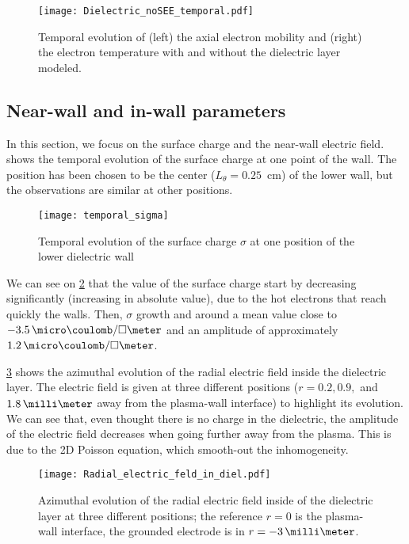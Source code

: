   \begin{figure}[hbt]
    \centering
    \texttt{[image: Dielectric\_noSEE\_temporal.pdf]}
    \caption{Temporal evolution of (left) the axial electron mobility and (right) the electron temperature with and without the dielectric layer modeled.}
    \label{fig-mod_diel_comp}
  \end{figure}

  
  \subsection{Near-wall and in-wall parameters} \label{subsec-nearwall}
    In this section, we focus on the surface charge and the near-wall electric field.
     shows the temporal evolution of the surface charge at one point of the wall.
    The position has been chosen to be the center ($L_{\theta} = 0.25$~cm) of the lower wall, but the observations are similar at other positions.
     
    \begin{figure}[hbt]
      \centering
      \texttt{[image: temporal\_sigma]}
      \caption{Temporal evolution of the surface charge $\sigma$ at one position of the lower dielectric wall}
      \label{fig-sigma_time}
    \end{figure}

    We can see on \cref{fig-sigma_time} that the value of the surface charge start by decreasing significantly (increasing in absolute value), due to the hot electrons that reach quickly the walls.
    Then, $\sigma$ growth and around a mean value close to $-3.5 \,\micro\coulomb/\square\meter$ and an amplitude of approximately $1.2 \,\micro\coulomb/\square\meter$.
    
    \cref{fig-indiel} shows the azimuthal evolution of the radial electric field inside the dielectric layer.
    The electric field is given at three different positions ($r=0.2, 0.9,$ and $1.8\,\milli\meter$ away from the plasma-wall interface) to highlight its evolution.
    We can see that, even thought there is no charge in the dielectric, the amplitude of the electric field decreases when going further away from the plasma.
    This is due to the \ac{2D} Poisson equation, which smooth-out the inhomogeneity.
     
    \begin{figure}[hbt]
      \centering
      \texttt{[image: Radial\_electric\_feld\_in\_diel.pdf]}
      \caption{Azimuthal evolution of the radial electric field inside of the dielectric layer at three different positions; the reference $r=0$ is the plasma-wall interface, the grounded electrode is in $r=-3\,\milli\meter$.}
      \label{fig-indiel}
    \end{figure}

